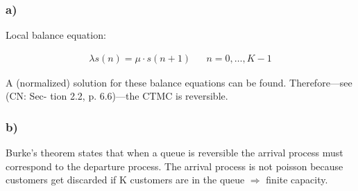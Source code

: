 \subsubsection*{a)}


Local balance equation:

\begin{align*}
\lambda s ( n ) = \mu \cdot s ( n + 1 ) && n=0,\ldots, K-1
\end{align*}

A (normalized) solution for these balance equations can be found. Therefore—see (CN: Sec-
tion 2.2, p. 6.6)—the CTMC is reversible.

\subsubsection*{b)}

Burke's theorem states that when a queue is reversible the arrival process must correspond to the departure process.
The arrival process is not poisson because customers get discarded if K customers are in the queue $\Rightarrow$ finite capacity.
